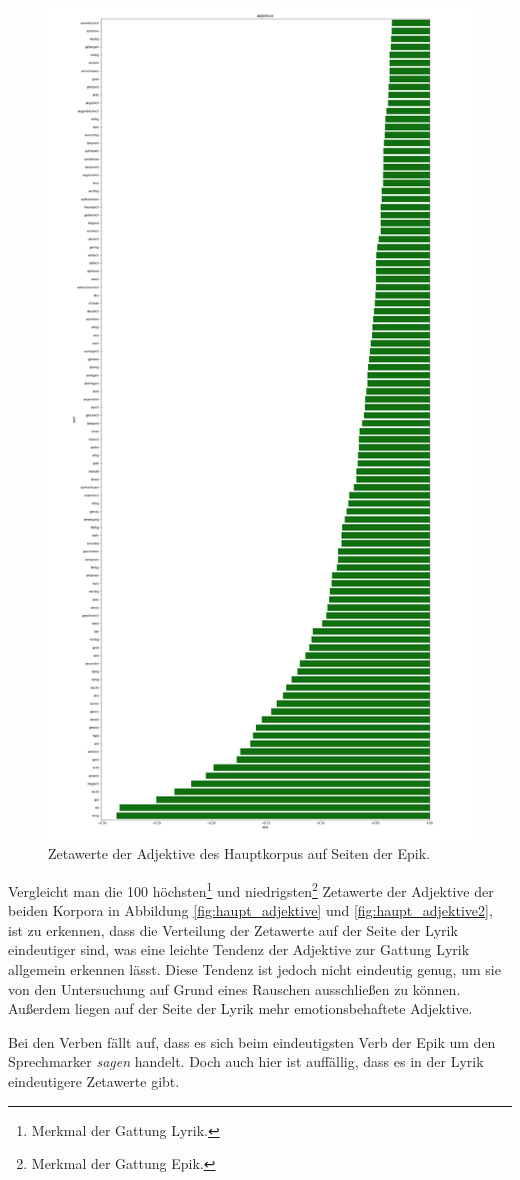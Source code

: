 \documentclass[a4paper,10p]{article}
\begin{document}
\begin{figure}{}
\begin{minipage}[b]{.45\linewidth}
        \includegraphics[width=.6\linewidth]{haupt_adjektive_pro_wort2.png}
        \caption{Zetawerte der Adjektive des Hauptkorpus  auf Seiten der Epik.}
        \label{haupt_adjektive2}
    \end{minipage}
\end{figure}


Vergleicht man die 100 höchsten\footnote{Merkmal der Gattung Lyrik.} und niedrigsten\footnote{Merkmal der Gattung Epik.} Zetawerte der Adjektive der beiden Korpora in Abbildung \ref{fig:haupt_adjektive} und \ref{fig:haupt_adjektive2}, ist zu erkennen, dass die Verteilung der Zetawerte auf der Seite der Lyrik eindeutiger sind, was eine leichte Tendenz der Adjektive zur Gattung Lyrik allgemein erkennen lässt. Diese Tendenz ist jedoch nicht eindeutig genug, um sie von den Untersuchung auf Grund eines Rauschen ausschließen zu können. Außerdem liegen auf der Seite der Lyrik mehr emotionsbehaftete Adjektive. \par 
\newpage

Bei den Verben fällt auf, dass es sich beim eindeutigsten Verb der Epik um den Sprechmarker \textit{sagen} handelt. Doch auch hier ist auffällig, dass es in der Lyrik eindeutigere Zetawerte gibt.  \par 
\end{document}
